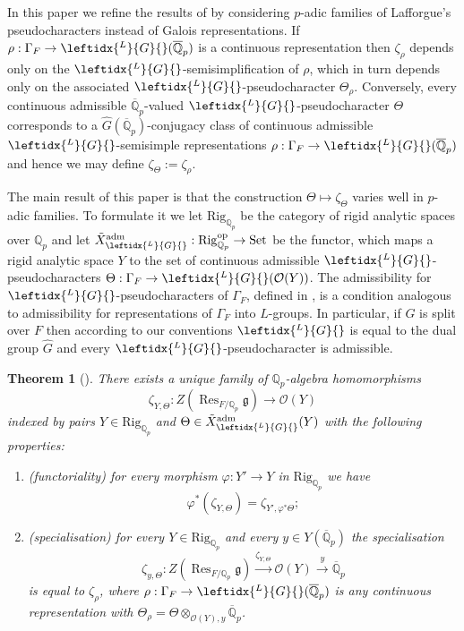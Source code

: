 \documentclass{amsart}
\newtheorem{thm}[prop]{Theorem}
\theoremstyle{definition}
\theoremstyle{remark}
\DeclareMathOperator{\Res}{Res}
\DeclareMathOperator{\Set}{Set}
\newcommand{\Qp}{\mathbb {Q}_p}
\newcommand{\Qpbar}{\overline{\mathbb{Q}}_p}
\newcommand{\OO}{\mathcal O}
\newcommand{\adm}{\mathrm{adm}}
\newcommand{\Ghat}{\widehat{G}}
\newcommand{\LG}{\leftidx{^L}{G}{}}
\newcommand{\Rig}{\mathrm{Rig}}
\newcommand{\op}{\mathrm{op}}
\begin{document}
In this paper we refine the results of \cite{DPS} by considering 
$p$-adic families of Lafforgue's pseudocharacters  instead 
of Galois representations. 
If $\rho: \Gamma_F\rightarrow \LG(\Qpbar)$ 
is a continuous representation then $\zeta_{\rho}$ depends 
only on the $\LG$-semisimplification of $\rho$, which in turn 
depends only on the associated $\LG$-pseudocharacter
$\Theta_{\rho}$. 
Conversely, every continuous admissible $\Qpbar$-valued  $\LG$-pseudocharacter $\Theta$ corresponds to a $\Ghat(\Qpbar)$-conjugacy class of continuous admissible $\LG$-semisimple representations $\rho: \Gamma_F\rightarrow \LG(\Qpbar)$ and hence 
we may define $\zeta_{\Theta}:= \zeta_{\rho}$. 

The main result 
of this paper is that the construction $\Theta\mapsto \zeta_{\Theta}$ varies well in $p$-adic families.
To formulate it we let  $\Rig_{\Qp}$ be the category of rigid analytic spaces over $\Qp$ and let 
 $\tilde{X}^{\adm}_{\LG}: \Rig_{\Qp}^{\op}\rightarrow \Set$ be the functor, which 
maps a rigid analytic space $Y$ to 
the set of continuous admissible $\LG$-pseudocharacters 
$\Theta: \Gamma_F\rightarrow \LG(\OO(Y))$. The admissibility for 
$\LG$-pseudocharacters of $\Gamma_F$, defined in , is a condition
analogous to admissibility for representations of
$\Gamma_F$ into $L$-groups. In particular, if $G$ is 
split over $F$ then according to our conventions $\LG$ is equal to the dual group $\Ghat$ and every $\LG$-pseudocharacter is admissible. 

\begin{thm}[]\label{intro_main_L} There exists a unique  family of $\Qp$-algebra 
homomorphisms $$\zeta_{Y,\Theta}: Z(\Res_{F/\Qp} \mathfrak g)\rightarrow \OO(Y)$$ indexed by pairs $Y\in \Rig_{\Qp}$ and 
$\Theta\in \tilde{X}^{\adm}_{\LG}(Y)$ with the following properties:
\begin{enumerate} 
\item (functoriality) for every morphism $\varphi: Y'\rightarrow Y$ in $\Rig_{\Qp}$ we have $$\varphi^*(\zeta_{Y, \Theta})= \zeta_{Y', \varphi^* \Theta};$$
\item (specialisation) for every $Y\in \Rig_{\Qp}$ and every 
$y\in Y(\Qpbar)$ the specialisation 
$$\zeta_{y, \Theta}:  Z(\Res_{F/\Qp} \mathfrak g)
\overset{\zeta_{Y,\Theta}}{\longrightarrow} \OO(Y)\overset{y}{\longrightarrow} \Qpbar$$
is equal to $\zeta_{\rho}$, where $\rho: \Gamma_F \rightarrow 
\LG(\Qpbar)$ is any continuous representation with 
$\Theta_{\rho}= \Theta\otimes_{\OO(Y), y} \Qpbar$. 
\end{enumerate}
\end{thm}
\end{document}
